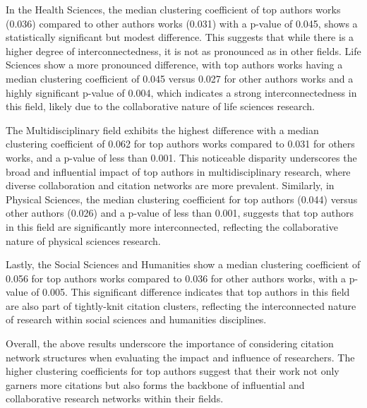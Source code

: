 In the Health Sciences, the median clustering coefficient of top authors works
(0.036) compared to other authors works (0.031) with a p-value of 0.045, shows a
statistically significant but modest difference. This suggests that while there
is a higher degree of interconnectedness, it is not as pronounced as in other
fields. Life Sciences show a more pronounced difference, with top authors works
having a median clustering coefficient of 0.045 versus 0.027 for other authors works
and a highly significant p-value of 0.004, which indicates a strong
interconnectedness in this field, likely due to the collaborative nature of
life sciences research.

The Multidisciplinary field exhibits the highest difference with a median
clustering coefficient of 0.062 for top authors works compared to 0.031 for others works,
and a p-value of less than 0.001. This noticeable disparity underscores the
broad and influential impact of top authors in multidisciplinary research,
where diverse collaboration and citation networks are more prevalent.
Similarly, in Physical Sciences, the median clustering coefficient for top
authors (0.044) versus other authors (0.026) and a p-value of less than 0.001,
suggests that top authors in this field are significantly more interconnected,
reflecting the collaborative nature of physical sciences research.

Lastly, the Social Sciences and Humanities show a median clustering coefficient
of 0.056 for top authors works compared to 0.036 for other authors works, with a p-value of
0.005. This significant difference indicates that top authors in this field are
also part of tightly-knit citation clusters, reflecting the interconnected
nature of research within social sciences and humanities disciplines.

Overall, the above results underscore the importance of considering citation
network structures when evaluating the impact and influence of researchers. The
higher clustering coefficients for top authors suggest that their work not only
garners more citations but also forms the backbone of influential and
collaborative research networks within their fields.
